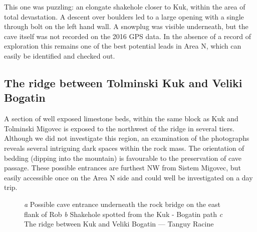 This one was puzzling: an elongate shakehole closer to Kuk, within the area of total devastation. A descent over boulders led to a large opening with a single through bolt on the left hand wall. A snowplug was visible underneath, but the cave itself was not recorded on the 2016 GPS data. In the absence of a record of exploration this remains one of the best potential leads in Area N, which can easily be identified and checked out.

\subsection{The ridge between Tolminski Kuk and Veliki Bogatin}

A section of well exposed limestone beds, within the same block as Kuk and Tolminski Migovec is exposed to the northwest of the ridge in several tiers. Although we did not investigate this region, an examination of the photographs reveals several intriguing dark spaces within the rock mass. The orientation of bedding (dipping into the mountain) is favourable to the preservation of cave passage.  These possible entrances are furthest NW from Sistem Migovec, but easily accessible once on the Area N side and could well be investigated on a day trip.

\begin{figure*}[t!]
\checkoddpage \ifoddpage \forcerectofloat \else \forceversofloat \fi
\centering
    \begin{subfigure}[t]{0.454\textwidth}
        \centering
        
        \caption{} \label{rockbridge}
    \end{subfigure}
        \hfill
\begin{subfigure}[t]{0.536\textwidth}
\centering
{} 
 \caption{}\label{shakehole next to kuk}
\end{subfigure}
    \vspace{0cm}
    \begin{subfigure}[t]{\textwidth}
    \centering
       
        \caption{} \label{ridge west}
    \end{subfigure}
    \caption{
    \emph{a} Possible cave entrance underneath the rock bridge on the east flank of Rob  
     \emph{b} Shakehole spotted from the Kuk - Bogatin path
     \emph{c} The ridge between Kuk and Veliki Bogatin --- Tanguy Racine }
\end{figure*}

